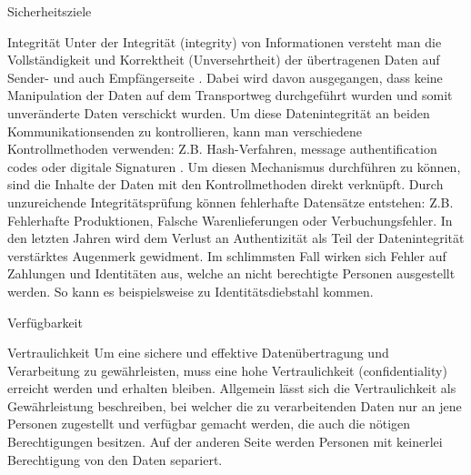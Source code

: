 \begin{section}{Sicherheitsziele}
\DIFdelend \label{Integrität}
   \begin{subsection}{Integrität}
    Unter der Integrität (integrity) \DIFaddbegin \cite{BSIa} \DIFaddend von Informationen versteht man die Vollständigkeit und 
    Korrektheit (Unversehrtheit) der übertragenen Daten auf Sender- und auch Empfängerseite \DIFaddbegin \cite{BSIInfosi}\DIFaddend . 
    Dabei wird davon ausgegangen, dass keine Manipulation der Daten auf dem Transportweg 
    durchgeführt wurden und somit unveränderte Daten verschickt wurden. Um diese 
    Datenintegrität an beiden Kommunikationsenden zu kontrollieren, kann man verschiedene 
    Kontrollmethoden verwenden: \ac{Z.B.} Hash-Verfahren, message authentification codes 
    oder digitale Signaturen \DIFaddbegin \cite{BSIBegriffe1}\DIFaddend . Um diesen Mechanismus durchführen zu können, sind die Inhalte 
    der Daten mit den Kontrollmethoden direkt verknüpft. 
    Durch unzureichende Integritätsprüfung können fehlerhafte Datensätze entstehen: Z.B. 
    Fehlerhafte Produktionen, Falsche Warenlieferungen oder Verbuchungsfehler. 
    In den letzten Jahren wird dem Verlust an Authentizität als Teil der Datenintegrität 
    verstärktes Augenmerk gewidment. 
    Im schlimmsten Fall wirken sich Fehler auf Zahlungen und Identitäten aus, welche an 
    nicht berechtigte Personen ausgestellt werden. So kann es beispielsweise zu 
    Identitätsdiebstahl kommen.    
    \DIFdelbegin %
\DIFdelend \\
   \end{subsection}

   \DIFaddbegin \label{Verfügbarkeit}
   \begin{subsection}{Verfügbarkeit}
    \\
   \end{subsection}

   \DIFaddend \label{Vertraulichkeit}
   \begin{subsection}{Vertraulichkeit}
    Um eine sichere und effektive Datenübertragung und Verarbeitung zu gewährleisten, muss 
    eine hohe Vertraulichkeit (confidentiality) erreicht werden und erhalten bleiben. 
    Allgemein lässt sich die Vertraulichkeit als Gewährleistung beschreiben, bei welcher die 
    zu verarbeitenden Daten nur an jene Personen zugestellt und verfügbar gemacht werden, die 
    auch die nötigen Berechtigungen besitzen. Auf der anderen Seite werden Personen mit 
    keinerlei Berechtigung von den Daten separiert.
    \\
    \end{subsection}
    \DIFaddbegin \pagebreak
\DIFaddend 


\end{section}
